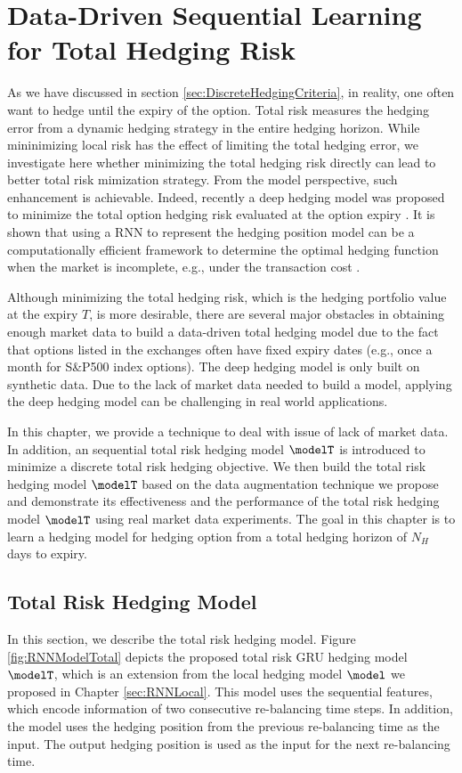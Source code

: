 

\chapter{Data-Driven Sequential Learning  for Total Hedging Risk}
\label{sec:RNNTotal}
As we have discussed in section \ref{sec:DiscreteHedgingCriteria}, in reality, one often want to hedge until the expiry of the option. Total risk measures the hedging error from a dynamic hedging strategy in the entire hedging horizon. While mininimizing local risk has the effect of limiting the total hedging error, we investigate here whether minimizing the total hedging risk directly can lead to better total risk mimization strategy. From the model perspective, such enhancement is achievable. Indeed, recently a deep hedging model was proposed to minimize the total option hedging risk evaluated at the option expiry  \citep{buehler2019deep}. It is shown  that using a RNN to represent the hedging position model can be a computationally efficient framework to determine the optimal hedging function when the market is incomplete, e.g., under the transaction cost \citep{buehler2019deep}.

Although minimizing the total hedging risk, which is  the hedging portfolio value at the expiry $T$, is more desirable, there are several major obstacles in obtaining enough market data to build a data-driven total hedging model due to the fact that options listed in the exchanges often have fixed expiry dates (e.g., once a month for S\&P500 index options). The deep hedging model \citep{buehler2019deep} is only built on synthetic data. Due to the lack of market data needed to build a  model, applying the  deep hedging model \citep{buehler2019deep} can be challenging in real world applications.

In this chapter, we  provide a technique to deal with issue of lack of market data. In addition, an   sequential total risk hedging model $\modelT$ is introduced to minimize a discrete total risk hedging objective. We then build the total risk hedging model $\modelT$ based on the data augmentation technique we propose and demonstrate its effectiveness  and the performance of  the  total risk hedging model $\modelT$ using real market data experiments.  The goal in this chapter is to learn a hedging model for hedging option from a total hedging horizon of $N_H$ days to expiry. 


\section{Total Risk Hedging Model}
\label{sec:TotalModelDes}
In this section, we describe the total risk hedging model.
Figure \ref{fig:RNNModelTotal} depicts the proposed total risk GRU  hedging  model $\modelT$,
which is an extension from the local hedging model $\model$ we proposed in Chapter \ref{sec:RNNLocal}.
This model uses the sequential features, which encode information of two consecutive re-balancing time steps. In addition, the model uses the hedging position from the previous re-balancing time as the input. The output hedging position is used as the input for the next re-balancing time.




